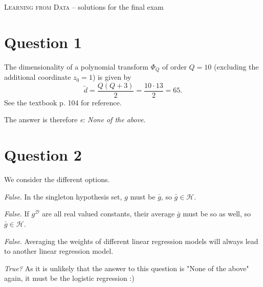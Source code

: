 \documentclass[	11pt,
				a4paper,
				twoside,
				titlepage,
				bibtotoc,
				openright,
				cleardoublepage=empty
				]{scrartcl}
\begin{document}
	
\textsc{Learning from Data} -- solutions for the final exam


\onehalfspacing
\raggedbottom
\pagestyle{plain}





\section{Question 1} %
The dimensionality of a polynomial transform $\varPhi_Q$ of order $Q = 10$ (excluding the additional coordinate $z_0 = 1$) is given by
\begin{equation}
\tilde{d} = \frac{Q(Q+3)}{2} = \frac{10 \cdot 13}{2} = 65.
\end{equation}
See the textbook p. 104 for reference.

The answer is therefore \emph{e}: \emph{None of the above}.
\vspace{\baselineskip}




\section{Question 2} %
We consider the different options.
\begin{alnum}
	\item 	\emph{False}. In the singleton hypothesis set, $g$ must be $\bar{g}$, so $\bar{g} \in \mathcal{H}$.
	\item	\emph{False}. If $g^{\mathcal{D}}$ are all real valued constants, their average $\bar{g}$ must be so as well, so $\bar{g} \in \mathcal{H}$.
	\item	\emph{False}. Averaging the weights of different linear regression models will always lead to another linear regression model.
	\item	\emph{True?} As it is unlikely that the answer to this question is "None of the above" again, it must be the logistic regression :)
\end{alnum}

\vspace{\baselineskip}
\end{document}
